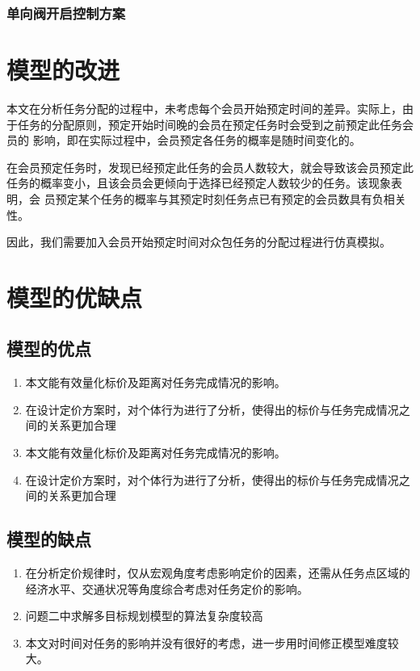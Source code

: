 \documentclass{cumcmthesis}
\begin{document}
	
	
\subsubsection{单向阀开启控制方案}
	
	






\section{模型的改进}
本文在分析任务分配的过程中，未考虑每个会员开始预定时间的差异。实际上，由 于任务的分配原则，预定开始时间晚的会员在预定任务时会受到之前预定此任务会员的 影响，即在实际过程中，会员预定各任务的概率是随时间变化的。

在会员预定任务时，发现已经预定此任务的会员人数较大，就会导致该会员预定此 任务的概率变小，且该会员会更倾向于选择已经预定人数较少的任务。该现象表明，会 员预定某个任务的概率与其预定时刻任务点已有预定的会员数具有负相关性。 

因此，我们需要加入会员开始预定时间对众包任务的分配过程进行仿真模拟。

\section{模型的优缺点}
\subsection{模型的优点}
\begin{enumerate}
\item 本文能有效量化标价及距离对任务完成情况的影响。 
\item 在设计定价方案时，对个体行为进行了分析，使得出的标价与任务完成情况之 间的关系更加合理
\item 本文能有效量化标价及距离对任务完成情况的影响。 
\item 在设计定价方案时，对个体行为进行了分析，使得出的标价与任务完成情况之 间的关系更加合理
\end{enumerate}
\subsection{模型的缺点}
\begin{enumerate}
\item 在分析定价规律时，仅从宏观角度考虑影响定价的因素，还需从任务点区域的 经济水平、交通状况等角度综合考虑对任务定价的影响。 
\item 问题二中求解多目标规划模型的算法复杂度较高
\item 本文对时间对任务的影响并没有很好的考虑，进一步用时间修正模型难度较大。
\end{enumerate}
\end{document}

